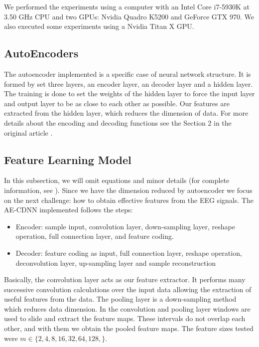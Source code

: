 We performed the experiments using a computer with an Intel Core i7-5930K at 3.50 GHz CPU and two GPUs: Nvidia Quadro K5200 and GeForce GTX 970. We also executed some experiments using a Nvidia Titan X GPU.


\subsection{AutoEncoders}

The autoencoder implemented is a specific case of neural network structure. It is formed by set three layers, an encoder layer, an decoder layer and a hidden layer. The training is done to set the weights of the hidden layer to force the input layer and output layer to be as close to each other as possible. Our features are extracted from the hidden layer, which reduces the dimension of data. For more details about the encoding and decoding functions see the Section 2 in the original article \cite{WenZha:2018}.

\subsection{Feature Learning Model}

In this subsection, we will omit equations and minor details (for complete information, see \cite{Shoeb,emami2019autoencoding}). Since we have the dimension reduced by autoencoder we focus on the next challenge: how to obtain effective features from the EEG signals. The AE-CDNN implemented follows the steps:

\begin{itemize}
\item Encoder: sample input, convolution layer, down-sampling layer, reshape operation, full connection layer, and feature coding.
\item Decoder: feature coding as input, full 
connection layer, reshape operation, deconvolution layer, up-sampling layer and sample reconstruction
\end{itemize}

Basically, the convolution layer acts as our feature extractor. It performs many successive convolution calculations over the input data allowing the extraction of useful features from the data. The pooling layer is a down-sampling method which reduces data dimension. In the convolution and pooling layer windows are used to slide and extract the feature maps. These intervals do not overlap each other, and with them we obtain the pooled feature maps. The feature sizes tested were $m \in \{2, 4, 8, 16, 32, 64, 128, \}$.


